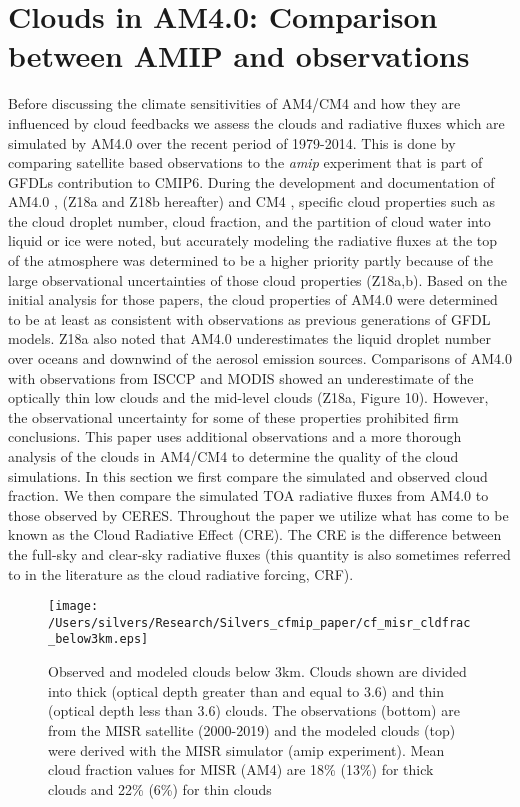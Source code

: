 \documentclass[draft]{agujournal2019}
\begin{document}
\section{Clouds in AM4.0: Comparison between AMIP and observations}


Before discussing the climate sensitivities of AM4/CM4 and how they are influenced by cloud feedbacks we assess
the clouds and radiative fluxes which are simulated by AM4.0 over the recent period of 1979-2014.  This is done 
by comparing satellite based observations to the \textit{amip} experiment that is part of GFDLs 
contribution to CMIP6.  
During the development and documentation of AM4.0 \cite{Zhao_etal_2018a, Zhao_etal_2018b}, 
(Z18a and Z18b hereafter) 
and CM4 \cite{Held_etal_2019}, specific cloud properties such as the 
cloud droplet number, cloud fraction, and the partition of cloud water into liquid or ice were noted, but 
accurately modeling the radiative fluxes at the top of the atmosphere was determined to be a 
higher priority partly because of the large observational uncertainties of those cloud properties (Z18a,b).   
Based on the initial analysis for those papers, the cloud properties of AM4.0 were determined to be
at least as consistent with observations as previous generations of GFDL models.  Z18a also noted 
that AM4.0 underestimates the liquid droplet number over oceans and downwind of the aerosol emission 
sources.   
Comparisons of AM4.0 with observations from ISCCP and MODIS showed an underestimate of 
the optically thin low clouds and the mid-level clouds (Z18a, Figure 10).  
However, the observational uncertainty for some of these properties prohibited firm conclusions.  This paper
uses additional observations and a more thorough analysis of the clouds in AM4/CM4 to determine 
the quality of the cloud simulations.        
In this section we first compare the simulated and observed cloud fraction.  We then compare  
the simulated TOA radiative fluxes from AM4.0 to those observed by CERES.    
Throughout the paper we utilize what has come to be known as the Cloud Radiative Effect (CRE).  The CRE is the 
difference between the full-sky and clear-sky radiative fluxes (this quantity is also sometimes referred
to in the literature as the cloud radiative forcing, CRF). 

\begin{figure}
  \centering
  \texttt{[image: /Users/silvers/Research/Silvers\_cfmip\_paper/cf\_misr\_cldfrac\_below3km.eps]}
  \caption{Observed and modeled clouds below 3km.  Clouds shown are divided into thick 
  (optical depth greater than and equal to 3.6) and thin (optical depth less than 3.6) 
  clouds.  The observations (bottom) are from the MISR satellite (2000-2019) and the modeled clouds (top) were derived 
  with the MISR simulator (amip experiment). Mean cloud fraction values for MISR 
  (AM4) are 18\% (13\%) for thick clouds and 22\% (6\%) for thin clouds}
  \label{fig:cf_misr_lowcl}
\end{figure}
\end{document}
